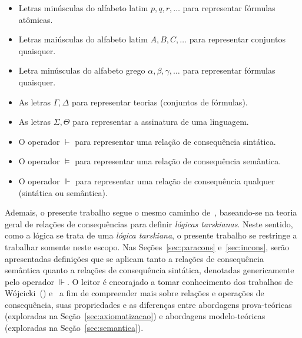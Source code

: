 \begin{itemize}
    \item Letras minúsculas do alfabeto latim $p, q, r, \ldots$ para representar fórmulas atômicas.
    \item Letras maiúsculas do alfabeto latim $A, B, C, \ldots$ para representar conjuntos quaisquer.
    \item Letra minúsculas do alfabeto grego $\alpha, \beta, \gamma, \ldots$ para representar fórmulas quaisquer.
    \item As letras $\Gamma, \Delta$ para representar teorias (conjuntos de fórmulas).
    \item As letras $\Sigma, \Theta$ para representar a assinatura de uma linguagem.
    \item O operador $\vdash$ para representar uma relação de consequência sintática.
    \item O operador $\vDash$ para representar uma relação de consequência semântica.
    \item O operador $\Vdash$ para representar uma relação de consequência qualquer (sintática ou semântica).
\end{itemize}

Ademais, o presente trabalho segue o mesmo caminho de~, baseando-se na teoria geral de relações de consequências para definir \textit{lógicas tarskianas}. Neste sentido, como a lógica \lfium{} se trata de uma \textit{lógica tarskiana}, o presente trabalho se restringe a trabalhar somente neste escopo. Nas Seções~\ref{sec:paracons} e~\ref{sec:incons}, serão apresentadas definições que se aplicam tanto a relações de consequência semântica quanto a relações de consequência sintática, denotadas genericamente pelo operador $\Vdash$. O leitor é encorajado a tomar conhecimento dos trabalhos de Wójcicki~(\citeyear{Wojcicki1984-WJCLOP,Wojcicki1988-WOJAAT,Wojcicki1988-WOJTOL}) e~ a fim de compreender mais sobre relações e operações de consequência, suas propriedades e as diferenças entre abordagens prova-teóricas (exploradas na Seção~\ref{sec:axiomatizacao}) e abordagens modelo-teóricas (exploradas na Seção~\ref{sec:semantica}).

